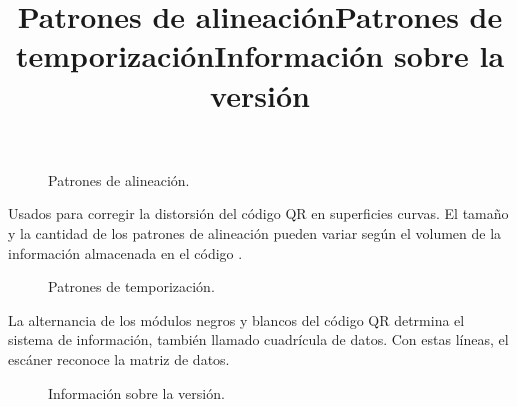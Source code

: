 \title{Patrones de alineación}

\begin{figure}[htbp]
	\begin{center}
		\caption{Patrones de alineación.}
		\label{fig:Patrones de alineacion1}
	\end{center}
\end{figure}

Usados para corregir la distorsión del código QR en superficies curvas. El tamaño y la cantidad de los patrones de alineación pueden variar según el volumen de la información almacenada en el código \cite{CitaA01}. \\

\title{Patrones de temporización}

\begin{figure}[htbp]
	\begin{center}
		\caption{Patrones de temporización.}
		\label{fig:temporizacion}
	\end{center}
\end{figure}

La alternancia de los módulos negros y blancos del código QR detrmina el sistema de información, también llamado cuadrícula de datos. Con estas líneas, el escáner reconoce la matriz de datos. 

\newpage

\title{Información sobre la versión}

\begin{figure}[htbp]
	\begin{center}
		\caption{Información sobre la versión.}
		\label{fig:version}
	\end{center}
\end{figure}

